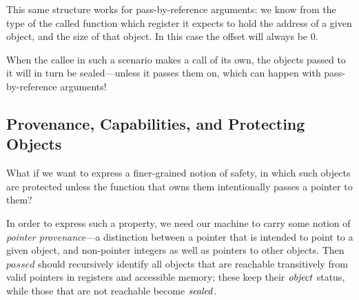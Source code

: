\documentclass[10pt,conference]{ieeetran}%
\theoremstyle{definition}
\begin{document}
This same structure works for pass-by-reference arguments: we know from the type of
the called function which register it expects to hold the address of a given object,
and the size of that object. In this case the offset will always be 0.

When the callee in such a scenario makes a call of its own, the objects passed to it
will in turn be sealed---unless it passes them on, which can happen with pass-by-reference
arguments!

\subsection{Provenance, Capabilities, and Protecting Objects}

What if we want to express a finer-grained notion of safety, in which
such objects are protected unless the function that owns them intentionally
passes a pointer to them?

In order to express such a property, we need our machine to carry some notion
of {\it pointer provenance}---a distinction between a pointer that is intended to
point to a given object, and non-pointer integers as well as pointers to other objects.
Then \(\mathit{passed}\) should recursively identify all objects that
are reachable transitively from valid pointers in registers and accessible memory;
these keep their \(\mathit{object}\) status, while those that are not reachable become \(\mathit{sealed}\).
         


\end{document}
